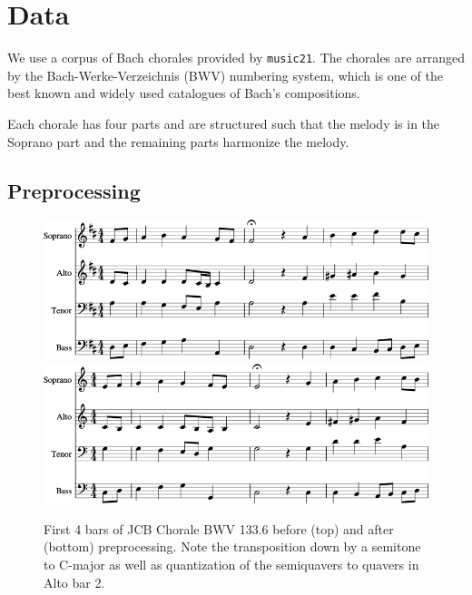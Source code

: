 \documentclass[dissertation.tex]{subfiles}
\begin{document}
\chapter{Data}

We use a corpus of Bach chorales provided by \texttt{music21}. The chorales are
arranged by the Bach-Werke-Verzeichnis (BWV) numbering system, which is one of
the best known and widely used catalogues of Bach's compositions.

Each chorale has four parts and are structured such that the melody is in
the Soprano part and the remaining parts harmonize the melody.

\section{Preprocessing}

\begin{figure}[htbp]
    \centering
    \includegraphics[width=1.0\linewidth]{Figures/bwv133-6-original-score-1.png}
    \includegraphics[width=1.0\linewidth]{Figures/bwv133-6-preproc-score-1.png}
    \caption{First 4 bars of JCB Chorale BWV 133.6 before (top) and after (bottom) preprocessing. Note
    the transposition down by a semitone to C-major as well as quantization of the
    semiquavers to quavers in Alto bar 2.}
    \label{fig:score-effects-preproc}
\end{figure}
\end{document}

